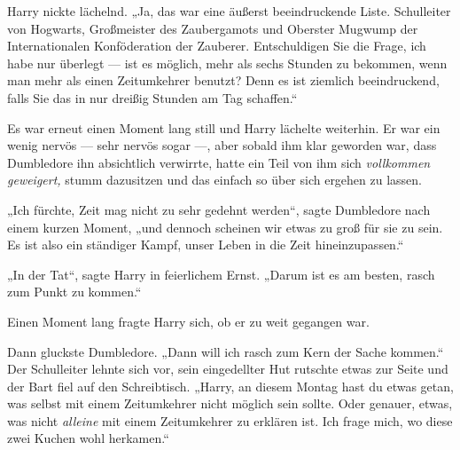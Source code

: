 Harry nickte lächelnd.
„Ja, das war eine äußerst beeindruckende Liste. Schulleiter von Hogwarts, Großmeister des Zaubergamots und Oberster Mugwump der Internationalen Konföderation der Zauberer. Entschuldigen Sie die Frage, ich habe nur überlegt — ist es möglich, mehr als sechs Stunden zu bekommen, wenn man mehr als einen Zeitumkehrer benutzt? Denn es ist ziemlich beeindruckend, falls Sie das in nur dreißig Stunden am Tag schaffen.“

Es war erneut einen Moment lang still und Harry lächelte weiterhin. Er war ein wenig nervös — sehr nervös sogar —, aber sobald ihm klar geworden war, dass Dumbledore ihn absichtlich verwirrte, hatte ein Teil von ihm sich \emph{vollkommen geweigert,} stumm dazusitzen und das einfach so über sich ergehen zu lassen.

„Ich fürchte, Zeit mag nicht zu sehr gedehnt werden“, sagte Dumbledore nach einem kurzen Moment, „und dennoch scheinen wir etwas zu groß für sie zu sein. Es ist also ein ständiger Kampf, unser Leben in die Zeit hineinzupassen.“

„In der Tat“, sagte Harry in feierlichem Ernst.
„Darum ist es am besten, rasch zum Punkt zu kommen.“

Einen Moment lang fragte Harry sich, ob er zu weit gegangen war.

Dann gluckste Dumbledore.
„Dann will ich rasch zum Kern der Sache kommen.“ Der Schulleiter lehnte sich vor, sein eingedellter Hut rutschte etwas zur Seite und der Bart fiel auf den Schreibtisch.
„Harry, an diesem Montag hast du etwas getan, was selbst mit einem Zeitumkehrer nicht möglich sein sollte. Oder genauer, etwas, was nicht \emph{alleine} mit einem Zeitumkehrer zu erklären ist. Ich frage mich, wo diese zwei Kuchen wohl herkamen.“

